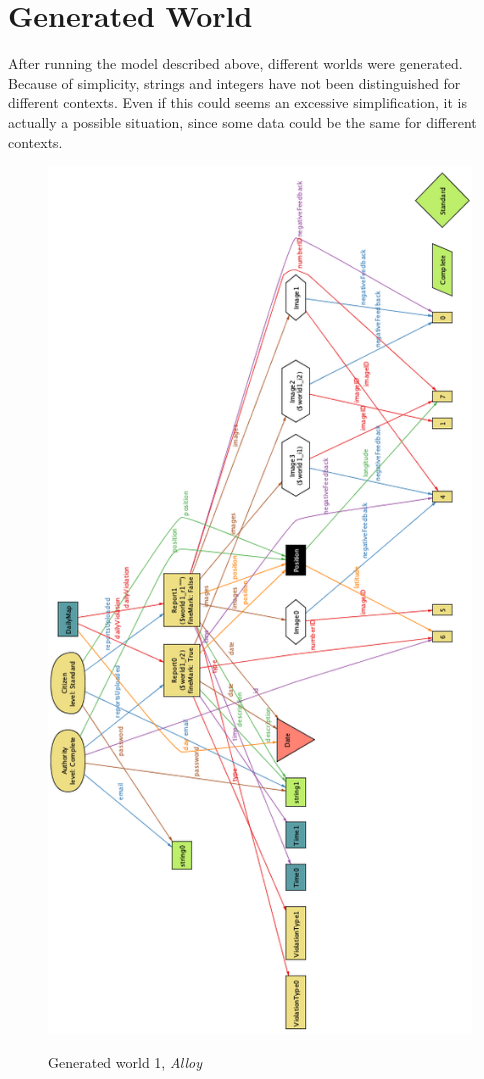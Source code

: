 \documentclass[../RASD.tex]{subfiles}
\begin{document}
    \section{Generated World}\label{sec:generated-world}
    After running the model described above, different worlds were generated.
    Because of simplicity, strings and integers have not been distinguished for different contexts.
    Even if this could seems an excessive simplification, it is actually a possible situation, since some data could be the same for different contexts.
    \begin{figure}[H]
        \centering
        \includegraphics[scale = 0.95]{assets/world1.png}\\[1.6 cm]
        \caption[Generated world 1, \textit{Alloy}]{Generated world 1, \textit{Alloy}}
    \end{figure}
\end{document}
